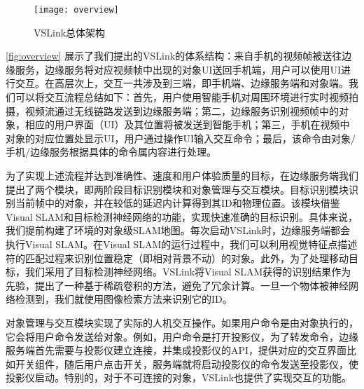 \begin{figure}[htbp]
	\centering
	\texttt{[image: overview]}
	\caption{VSLink总体架构}
	\label{fig:overview}
\end{figure}

\autoref{fig:overview} 展示了我们提出的VSLink的体系结构：来自手机的视频帧被送往边缘服务，边缘服务将对应视频帧中出现的对象UI送回手机端，用户可以使用UI进行交互。在高层次上，交互一共涉及到三端，即手机端、边缘服务端和对象端。我们可以将交互流程总结如下：首先，用户使用智能手机对周围环境进行实时视频拍摄，视频流通过无线链路发送到边缘服务端；第二，边缘服务识别视频帧中的对象，相应的用户界面（UI）及其位置将被发送到智能手机；第三，手机在视频中对象的对应位置处显示UI，用户通过操作UI输入交互命令；最后，该命令由对象/手机/边缘服务根据具体的命令属内容进行处理。

为了实现上述流程并达到准确性、速度和用户体验质量的目标，在边缘服务端我们提出了两个模块，即两阶段目标识别模块和对象管理与交互模块。目标识别模块识别当前帧中的对象，并在较低的延迟内计算得到其ID和物理位置。该模块借鉴Visual SLAM和目标检测神经网络的功能，实现快速准确的目标识别。具体来说，我们提前构建了环境的对象级SLAM地图。每次启动VSLink时，边缘服务端都会执行Visual SLAM。在Visual SLAM的运行过程中，我们可以利用视觉特征点描述符的匹配过程来识别位置稳定（即相对背景不动）的对象。此外，为了处理移动目标，我们采用了目标检测神经网络。VSLink将Visual SLAM获得的识别结果作为先验，提出了一种基于稀疏卷积的方法，避免了冗余计算。一旦一个物体被神经网络检测到，我们就使用图像检索方法来识别它的ID。

对象管理与交互模块实现了实际的人机交互操作。如果用户命令是由对象执行的，它会将用户命令发送给对象。例如，用户命令是打开投影仪，为了转发命令，边缘服务端首先需要与投影仪建立连接，并集成投影仪的API，提供对应的交互界面比如开关组件，随后用户点击开关，服务端就将启动投影仪的命令发送至投影仪，使投影仪启动。特别的，对于不可连接的对象，VSLink也提供了实现交互的功能。


